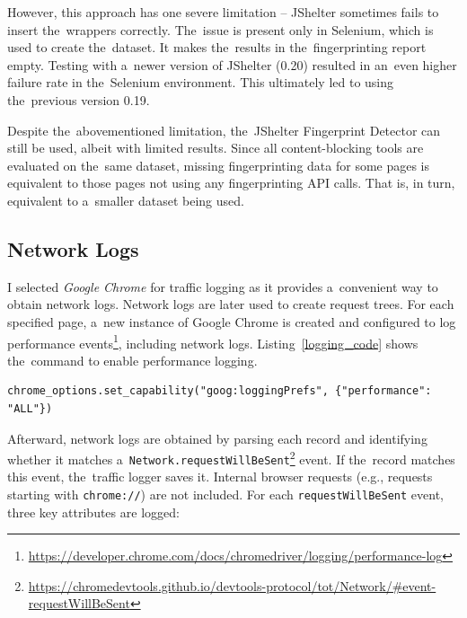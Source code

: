 However, this approach has one severe limitation -- JShelter sometimes fails to insert the~wrappers correctly. The~issue is present only in Selenium, which is used to create the~dataset. It makes the~results in the~fingerprinting report empty. Testing with a~newer version of JShelter (0.20) resulted in an~even higher failure rate in the~Selenium environment. This ultimately led to using the~previous version 0.19.

Despite the~abovementioned limitation, the~JShelter Fingerprint Detector can still be used, albeit with limited results. Since all content-blocking tools are evaluated on the~same dataset, missing fingerprinting data for some pages is equivalent to those pages not using any fingerprinting API calls. That is, in turn, equivalent to a~smaller dataset being used.

\subsection{Network Logs}
I selected \emph{Google Chrome} for traffic logging as it provides a~convenient way to obtain network logs. Network logs are later used to create request trees. For each specified page, a~new instance of Google Chrome is created and configured to log performance events\footnote{\url{https://developer.chrome.com/docs/chromedriver/logging/performance-log}}, including network logs. Listing~\ref{logging_code} shows the~command to enable performance logging.

\setcounter{listing}{0}
\begin{center}
    \begin{minipage}{\textwidth}
        \begin{lstlisting}[style=pythonstyle, label={logging_code}, caption={Command to configure the~browser to log performance events}]
chrome_options.set_capability("goog:loggingPrefs", {"performance": "ALL"})
        \end{lstlisting}
    \end{minipage}
\end{center}

Afterward, network logs are obtained by parsing each record and identifying whether it matches a~\texttt{Network.requestWillBeSent}\footnote{\url{https://chromedevtools.github.io/devtools-protocol/tot/Network/\#event-requestWillBeSent}} event. If the~record matches this event, the~traffic logger saves it. Internal browser requests (e.g., requests starting with \texttt{chrome://}) are not included. For each \texttt{requestWillBeSent} event, three key attributes are logged:

